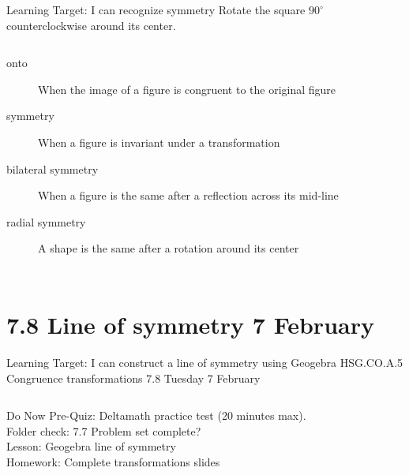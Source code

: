 \begin{frame}{Learning Target: I can recognize symmetry}
  Rotate the square $90^\circ$ counterclockwise around its center. \vspace{0.25cm}
  \begin{columns}
\begin{description}
  \item[onto] When the image of a figure is congruent to the original figure
  \item[symmetry] When a figure is invariant under a transformation
  \item[bilateral symmetry] When a figure is the same after a reflection across its mid-line
  \item[radial symmetry] A shape is the same after a rotation around its center
\end{description}
    \begin{flushright}
    \end{flushright}
  \end{columns}
\end{frame}

\section{7.8 Line of symmetry \hfill 7 February \,}
\begin{frame}{Learning Target: I can construct a line of symmetry using Geogebra}
  {HSG.CO.A.5 Congruence transformations \hfill \alert{7.8 Tuesday 7 February}}
  \begin{columns}
    Do Now Pre-Quiz: Deltamath practice test (20 minutes max). \\[0.3cm]
    Folder check: 7.7 Problem set complete? \\[0.3cm]
    Lesson: Geogebra line of symmetry \\[0.3cm]
    Homework: Complete transformations slides
    \begin{center}
    \end{center}
  \end{columns}
\end{frame}

